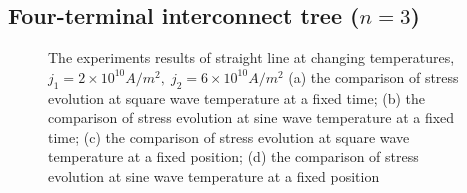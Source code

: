 \subsection{Four-terminal interconnect tree ($n=3$)}
\begin{figure}[!h]
\centering
{}
\caption{The experiments results of straight line at changing temperatures, $j_1=2\times10^{10}A/m^2,\;j_2=6\times10^{10}A/m^2$ (a) the comparison of stress evolution at square wave temperature at a fixed time; (b) the comparison of stress evolution at sine wave temperature at a fixed time; (c) the comparison of stress evolution at square wave temperature at a fixed position; (d) the comparison of stress evolution at sine wave temperature at a fixed position}
\label{fig:S3Results1}
\end{figure}


